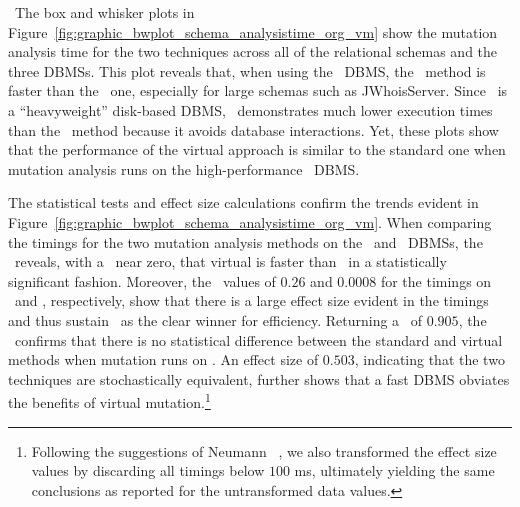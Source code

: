 

~The box and whisker plots in Figure~\ref{fig:graphic_bwplot_schema_analysistime_org_vm} show the mutation analysis time for the two techniques across all of the relational schemas and the three DBMSs. This plot reveals that, when using the \HyperSQL~DBMS, the \virtual~method is faster than the \Original~one, especially for large schemas such as JWhoisServer. Since \Postgres~is a ``heavyweight'' disk-based DBMS, \vma~demonstrates much lower execution times than the \Original~method because it avoids database interactions. Yet, these plots show that the performance of the virtual approach is similar to the standard one when mutation analysis runs on the high-performance \sqlite~DBMS.


The statistical tests and effect size calculations confirm the trends evident in Figure~\ref{fig:graphic_bwplot_schema_analysistime_org_vm}. When comparing the timings for the two mutation analysis methods on the \HyperSQL~and \Postgres~DBMSs, the \wilcoxon~reveals, with a \pvalue~near zero, that virtual is faster than \Original~in a statistically significant fashion. Moreover, the \atwelve~values of $0.26$ and $0.0008$ for the timings on \HyperSQL~and \Postgres, respectively, show that there is a large effect size evident in the timings and thus sustain \vma~as the clear winner for efficiency. Returning a \pvalue~of $0.905$, the \wilcoxon~confirms that there is no statistical difference between the standard and virtual methods when mutation runs on \sqlite. An effect size of $0.503$, indicating that the two techniques are stochastically equivalent, further shows that a fast DBMS obviates the benefits of virtual mutation.\footnote{{\scriptsize Following the suggestions of Neumann \etal~\cite{Neumann2015}, we also transformed the effect size values by discarding all timings below $100$ ms, ultimately yielding the same conclusions as reported for the untransformed data values.}}




